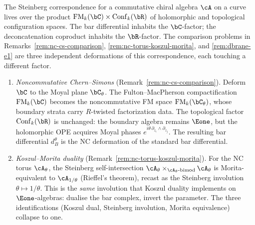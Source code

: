 \providecommand{\FM}{\mathrm{FM}}
\providecommand{\Conf}{\mathrm{Conf}}
\providecommand{\BM}{\mathrm{BM}}
\providecommand{\HC}{\mathrm{HC}}
\providecommand{\dR}{\mathrm{dR}}

\begin{remark}
\label{rem:three-deformations}
The Steinberg correspondence for a commutative chiral algebra $\cA$ on a curve
lives over the product $\FM_k(\bC) \times \Conf_k(\bR)$ of holomorphic and
topological configuration spaces. The bar differential inhabits the
$\bC$-factor; the deconcatenation coproduct inhabits the $\bR$-factor.
The comparison problems in
Remarks~\ref{rem:nc-cs-comparison}, \ref{rem:nc-torus-koszul-morita},
and \ref{rem:dbrane-e1} are three independent deformations of this
correspondence, each touching a different factor.

\begin{enumerate}[label=(\Roman*)]
\item \emph{Noncommutative Chern--Simons} (Remark~\ref{rem:nc-cs-comparison}).
 Deform $\bC$ to the Moyal plane $\bC_\theta$.
 The Fulton--MacPherson compactification $\FM_k(\bC)$ becomes the
 noncommutative FM space $\FM_k(\bC_\theta)$, whose boundary strata carry
 $R$-twisted factorization data.
 The topological factor $\Conf_k(\bR)$ is unchanged: the boundary
 algebra remains $\Eone$, but the holomorphic OPE acquires Moyal phases
 $e^{i\theta\, \partial_{z_i} \wedge \partial_{z_j}}$.
 The resulting bar differential $d_B^\theta$ is the NC deformation
 of the standard bar differential.

\item \emph{Koszul--Morita duality} (Remark~\ref{rem:nc-torus-koszul-morita}).
 For the NC torus $\cA_\theta$, the Steinberg self-intersection
 $\cA_\theta \times_{\cA_\theta\text{-bimod}} \cA_\theta$
 is Morita-equivalent to $\cA_{1/\theta}$ (Rieffel's theorem),
 recast as the Steinberg involution $\theta \mapsto 1/\theta$.
 This is the \emph{same} involution that Koszul duality implements on
 $\Eone$-algebras: dualise the bar complex, invert the parameter.
 The three identifications (Koszul dual, Steinberg involution,
 Morita equivalence) collapse to one.


\end{enumerate}
\end{remark}
